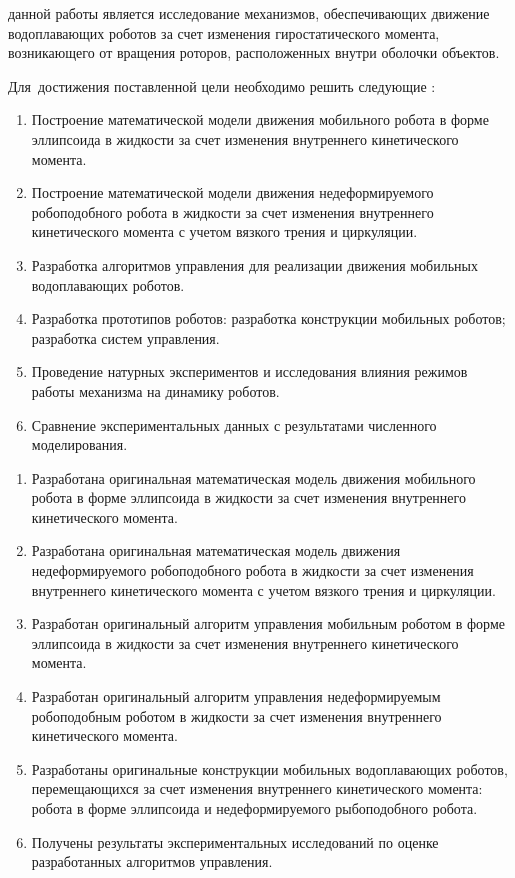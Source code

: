 {\aim} данной работы является исследование механизмов, обеспечивающих движение водоплавающих роботов за счет изменения гиростатического момента, возникающего от вращения роторов, расположенных внутри оболочки объектов.

Для~достижения поставленной цели необходимо решить следующие {\tasks}:
\begin{enumerate}
  \item Построение математической модели движения мобильного робота в форме эллипсоида в жидкости за счет изменения внутреннего кинетического момента.
  \item Построение математической модели движения недеформируемого робоподобного робота в жидкости за счет изменения внутреннего кинетического момента с учетом вязкого трения и циркуляции.
  \item Разработка алгоритмов управления для реализации движения мобильных водоплавающих роботов.
  \item Разработка прототипов роботов: разработка конструкции мобильных роботов; разработка систем управления.
  \item Проведение натурных экспериментов и исследования влияния режимов работы механизма на динамику роботов.
  \item Сравнение экспериментальных данных с результатами численного моделирования.
\end{enumerate}


{\novelty}
\begin{enumerate}
  \item Разработана оригинальная математическая модель движения мобильного робота в форме эллипсоида в жидкости за счет изменения внутреннего кинетического момента.
  \item Разработана оригинальная математическая модель движения недеформируемого робоподобного робота в жидкости за счет изменения внутреннего кинетического момента с учетом вязкого трения и циркуляции.
  \item Разработан оригинальный алгоритм управления мобильным роботом в форме эллипсоида в жидкости за счет изменения внутреннего кинетического момента.
  \item Разработан оригинальный алгоритм управления недеформируемым робоподобным роботом в жидкости за счет изменения внутреннего кинетического момента.
  \item Разработаны оригинальные конструкции мобильных водоплавающих роботов, перемещающихся за счет изменения внутреннего кинетического момента: робота в форме эллипсоида и недеформируемого рыбоподобного робота.
  \item Получены результаты экспериментальных исследований по оценке разработанных алгоритмов управления.
\end{enumerate}

